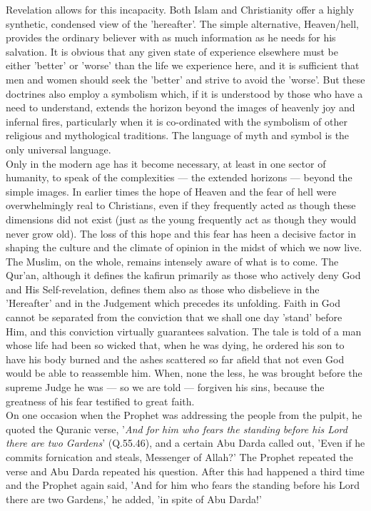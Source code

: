 \documentclass[11pt, b5paper, twoside]{book}
\begin{document}
Revelation allows for this incapacity. Both Islam and Christianity offer a highly synthetic, 
condensed view of the 'hereafter'. The simple alternative, Heaven/hell, provides the ordinary 
believer with as much information as he needs for his salvation. It is obvious that any given state 
of experience elsewhere must be either 'better' or 'worse' than the life we experience here, and it 
is sufficient that men and women should seek the 'better' and strive to avoid the 'worse'. But these 
doctrines also employ a symbolism which, if it is understood by those who have a need to understand, 
extends the horizon beyond the images of heavenly joy and infernal fires, particularly when it is 
co-ordinated with the symbolism of other religious and mythological traditions. The language of myth 
and symbol is the only universal language. \\

Only in the modern age has it become necessary, at least in one sector of humanity, to speak of the 
complexities --- the extended horizons --- beyond the simple images. In earlier times the hope of Heaven 
and the fear of hell were overwhelmingly real to Christians, even if they frequently acted as though 
these dimensions did not exist (just as the young frequently act as though they would never grow 
old). The loss of this hope and this fear has heen a decisive factor in shaping the culture and the 
climate of opinion in the midst of which we now live. \\

The Muslim, on the whole, remains intensely aware of what is to come. The Qur'an, although it defines 
the kafirun primarily as those who actively deny God and His Self-revelation, defines them also as 
those who disbelieve in the 'Hereafter' and in the Judgement which precedes its unfolding. Faith in 
God cannot be separated from the conviction that we shall one day 'stand' before Him, and this 
conviction virtually guarantees salvation. The tale is told of a man whose life had been so wicked 
that, when he was dying, he ordered his son to have his body burned and the ashes scattered so far 
afield that not even God would be able to reassemble him. When, none the less, he was brought before 
the supreme Judge he was --- so we are told --- forgiven his sins, because the greatness of his fear 
testified to great faith.\\ 

On one occasion when the Prophet was addressing the people from the pulpit, he quoted the Quranic 
verse, '\emph{And for him who fears the standing before his Lord there are two Gardens}' (Q.55.46), and a 
certain Abu Darda called out, 'Even if he commits fornication and steals, Messenger of Allah?' The 
Prophet repeated the verse and Abu Darda repeated his question. After this had happened a third time 
and the Prophet again said, 'And for him who fears the standing before his Lord there are two 
Gardens,' he added, 'in spite of Abu Darda!' \\
\end{document}
